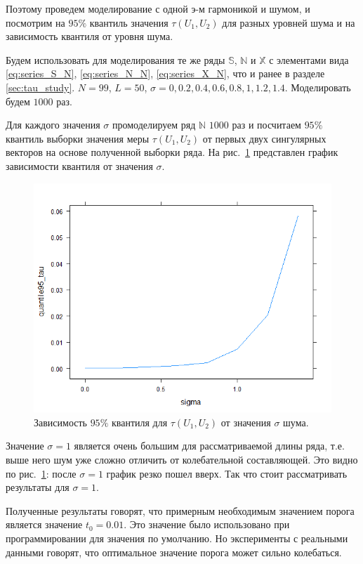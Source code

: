 \documentclass[specialist,
               substylefile = spbu.rtx,
               subf,href,colorlinks=true, 12pt]{disser}
\begin{document}
Поэтому проведем моделирование с одной э-м гармоникой и шумом, и посмотрим на $95\%$ квантиль значения $\tau(U_1, U_2)$ для разных уровней шума и на зависимость квантиля от уровня шума.

Будем использовать для моделирования те же ряды $\mathbb{S}$, $\mathbb{N}$ и $\mathbb{X}$ с элементами вида
\eqref{eq:series_S_N}, \eqref{eq:series_N_N}, \eqref{eq:series_X_N}, что и ранее в разделе \ref{sec:tau_study}.
$N = 99$, $L = 50$, $\sigma = 0, 0.2, 0.4, 0.6, 0.8, 1, 1.2, 1.4$. Моделировать будем $1000$ раз.

Для каждого значения $\sigma$ промоделируем ряд $\mathbb{N}$ $1000$ раз и посчитаем $95\%$ квантиль выборки значения меры $\tau(U_1, U_2)$ от первых двух сингулярных векторов на основе полученной выборки ряда. На рис.~\ref{fig:q95_tau1} представлен график зависимости квантиля от значения $\sigma$.
\begin{figure}[!hhh]
	\begin{center}
	\includegraphics[width = 4.5in]{q95_tau1}
	\end{center}
	\caption{Зависимость $95\%$ квантиля для $\tau(U_1, U_2)$ от значения $\sigma$ шума.}
	\label{fig:q95_tau1}
\end{figure}

Значение $\sigma = 1$ является очень большим для рассматриваемой длины ряда, т.е. выше него шум уже сложно отличить от колебательной составляющей. Это видно по рис.~\ref{fig:q95_tau1}: после $\sigma=1$ график резко пошел вверх. Так что стоит рассматривать результаты для $\sigma=1$.

Полученные результаты говорят, что примерным необходимым значением порога является значение $t_0 = 0.01$.
Это значение было использовано при программировании для значения по умолчанию. Но эксперименты с реальными данными говорят, что оптимальное значение порога может сильно колебаться.
\end{document}
